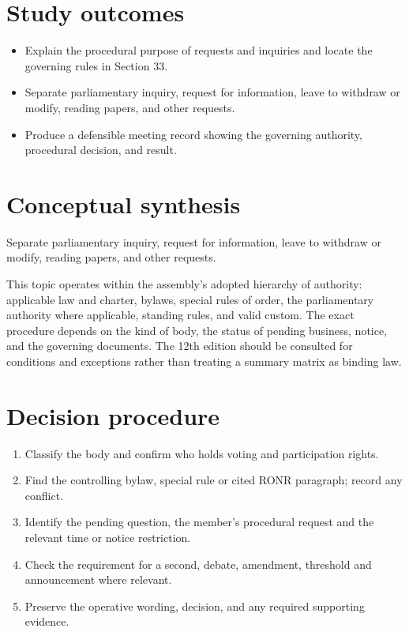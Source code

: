\documentclass[11pt]{article}
\begin{document}
\SuiteOpen
{}
\section{Study outcomes}
\begin{itemize}[leftmargin=*,itemsep=4pt]
\item Explain the procedural purpose of requests and inquiries and locate the governing rules in Section 33.
\item Separate parliamentary inquiry, request for information, leave to withdraw or modify, reading papers, and other requests.
\item Produce a defensible meeting record showing the governing authority, procedural decision, and result.
\end{itemize}

\section{Conceptual synthesis}
Separate parliamentary inquiry, request for information, leave to withdraw or modify, reading papers, and other requests.

This topic operates within the assembly’s adopted hierarchy of authority: applicable law and charter, bylaws, special rules of order, the parliamentary authority where applicable, standing rules, and valid custom. The exact procedure depends on the kind of body, the status of pending business, notice, and the governing documents. The 12th edition should be consulted for conditions and exceptions rather than treating a summary matrix as binding law.
\section{Decision procedure}
\begin{enumerate}[leftmargin=*,itemsep=4pt]
\item Classify the body and confirm who holds voting and participation rights.
\item Find the controlling bylaw, special rule or cited RONR paragraph; record any conflict.
\item Identify the pending question, the member’s procedural request and the relevant time or notice restriction.
\item Check the requirement for a second, debate, amendment, threshold and announcement where relevant.
\item Preserve the operative wording, decision, and any required supporting evidence.
\end{enumerate}
\end{document}
